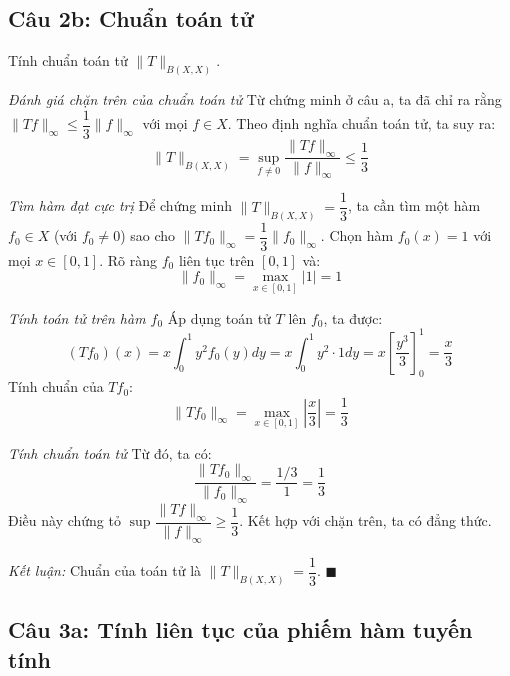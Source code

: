 \subsection*{Câu 2b: Chuẩn toán tử}

\begin{questionbox}
Tính chuẩn toán tử $\|T\|_{B(X, X)}$.
\end{questionbox}

\begin{solution}
\textit{Đánh giá chặn trên của chuẩn toán tử}
Từ chứng minh ở câu a, ta đã chỉ ra rằng $\|Tf\|_\infty \leq \dfrac{1}{3}\|f\|_\infty$ với mọi $f \in X$.
Theo định nghĩa chuẩn toán tử, ta suy ra:
\[ 
    \|T\|_{B(X,X)} = \sup_{f \neq 0} \dfrac{\|Tf\|_\infty}{\|f\|_\infty} \leq \dfrac{1}{3}
\]

\textit{Tìm hàm đạt cực trị}
Để chứng minh $\|T\|_{B(X,X)} = \dfrac{1}{3}$, ta cần tìm một hàm $f_0 \in X$ (với $f_0 \neq 0$) sao cho $\|Tf_0\|_\infty = \dfrac{1}{3}\|f_0\|_\infty$.
Chọn hàm $f_0(x) = 1$ với mọi $x \in [0,1]$. Rõ ràng $f_0$ liên tục trên $[0,1]$ và:
\[ 
    \|f_0\|_\infty = \max_{x \in [0,1]} |1| = 1 
\]

\textit{Tính toán tử trên hàm $f_0$}
Áp dụng toán tử $T$ lên $f_0$, ta được:
\[ 
    (Tf_0)(x) = x \int_0^1 y^2 f_0(y) dy = x \int_0^1 y^2 \cdot 1 dy = x \left[ \dfrac{y^3}{3} \right]_0^1 = \dfrac{x}{3}
\]
Tính chuẩn của $Tf_0$:
\[ 
    \|Tf_0\|_\infty = \max_{x \in [0,1]} \left| \dfrac{x}{3} \right| = \dfrac{1}{3}
\]

\textit{Tính chuẩn toán tử}
Từ đó, ta có:
\[
    \dfrac{\|Tf_0\|_\infty}{\|f_0\|_\infty} = \dfrac{1/3}{1} = \dfrac{1}{3}
\]
Điều này chứng tỏ $\sup \dfrac{\|Tf\|_\infty}{\|f\|_\infty} \geq \dfrac{1}{3}$. 
Kết hợp với chặn trên, ta có đẳng thức.

\textit{Kết luận:} Chuẩn của toán tử là $\|T\|_{B(X, X)} = \dfrac{1}{3}$. $\blacksquare$
\end{solution}

\subsection*{Câu 3a: Tính liên tục của phiếm hàm tuyến tính}

